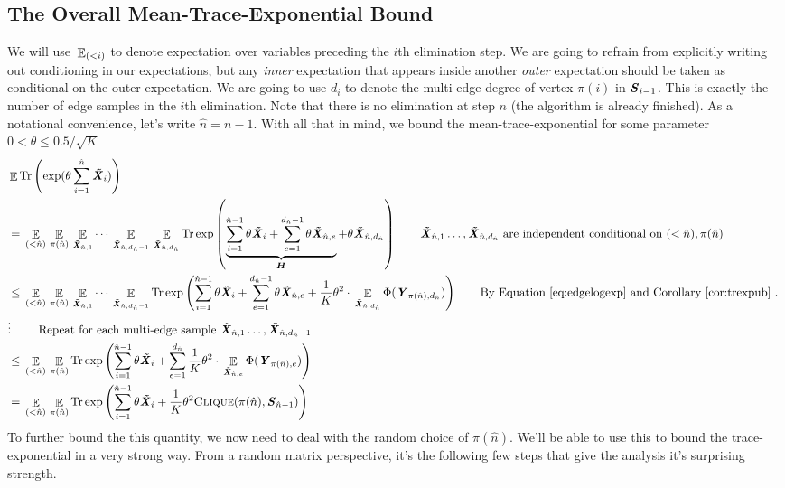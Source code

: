 \subsection{The Overall Mean-Trace-Exponential Bound}

We will use ${}\mathop{\mathbb{E}}_{(<i)} $ to denote expectation over variables preceding the
$i$th elimination step.
We are going to refrain from explicitly writing out conditioning in
our expectations, but any \emph{inner} expectation that appears inside another
\emph{outer} expectation should be taken as conditional on the outer
expectation.
We are going to use $d_i$ to denote the multi-edge degree of vertex
$\pi(i)$ in $\boldsymbol{\mathit{S}}_{i-1}$. This is exactly the number of edge samples in
the $i$th elimination.
Note that there is no elimination at step $n$ (the algorithm is
already finished). As a notational convenience, let's write $\hat{n} =
n-1$.
With all that in mind, we bound the mean-trace-exponential for some
parameter
$0 <\theta \leq 0.5/\sqrt{K}$
\begin{align}
    \label{eq:fulltrexpub1}
&  \Ex{}\trace{\exp(\theta\sum_{i = 1}^{\hat{n}}\XXtil_{i} )}
  \\ \nonumber
&  = \Ex{(<\hat{n})} \Ex{\pi(\hat{n})} \Ex{\XXtil_{\hat{n},1}} \cdots \Ex{\XXtil_{\hat{n},d_{\hat{n}}-1}}  \Ex{\XXtil_{\hat{n},d_{\hat{n}}}}
   \tr\exp\left( \underbrace{\sum_{i = 1}^{\hat{n}-1}\theta\XXtil_{i}
     + \sum_{e =1}^{d_{\hat{n}}-1}\theta\XXtil_{\hat{n},e}}_{\HH}
    +\theta \XXtil_{\hat{n},d_{\hat{n}}} \right)
   \tag*{$\XXtil_{\hat{n},1} \ldots, \XXtil_{\hat{n},d_{\hat{n}}}$  are independent
    conditional on $(<\hat{n}), \pi(\hat{n})$
  }
\\  \nonumber
&  \leq \Ex{(<\hat{n})} \Ex{\pi(\hat{n})} \Ex{\XXtil_{\hat{n},1}} \cdots \Ex{\XXtil_{\hat{n},d_{\hat{n}}-1}}
   \tr\exp\left(\sum_{i = 1}^{\hat{n}-1}\theta\XXtil_{i}
     +  \sum_{e =1}^{d_{\hat{n}}-1}\theta\XXtil_{\hat{n},e}
    +  \frac{1}{K}\theta^2\cdot
    \Ex{\XXtil_{\hat{n},d_{\hat{n}}}}{\Phi(\YY_{\pi(\hat{n}), d_{\hat{n}}})}
  \right)
  \tag*{By Equation~\eqref{eq:edgelogexp} and Corollary~\ref{cor:trexpub}
  .
  }
  \\ \nonumber
&  \vdots
 \tag*{ Repeat for each multi-edge sample $\XXtil_{\hat{n},1} \ldots,
       \XXtil_{\hat{n},d_{\hat{n}}-1}$ }
\\  \nonumber
&  \leq  \Ex{(<\hat{n})} \Ex{\pi(\hat{n})}
   \tr\exp\left(\sum_{i = 1}^{\hat{n}-1}\theta\XXtil_{i}
     +  \sum_{e =1}^{d_{\hat{n}} }
     \frac{1}{K}\theta^2\cdot
    \Ex{\XXtil_{\hat{n},e}}{\Phi(\YY_{\pi(\hat{n}), e})}
     \right)
 \\  \nonumber
&  = \Ex{(<\hat{n})} \Ex{\pi(\hat{n})}
   \tr\exp\left(\sum_{i = 1}^{\hat{n}-1}\theta\XXtil_{i}
     +
     \frac{1}{K}\theta^2\vcliq{\pi(\hat{n})}{\SS_{\hat{n}-1}}
  \right)
\end{align}
To further bound the this quantity, we now need to deal with the
random choice of $\pi(\hat{n})$.
We'll be able to use this to bound the trace-exponential in a very
strong way.
From a random matrix perspective, it's the following few
steps that give the analysis it's surprising strength.

